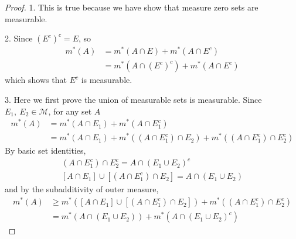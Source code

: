 \documentclass[lang=en, 12pt]{elegantbook}
\begin{document}
            \begin{proof}
                1. This is true because we have show that measure zero sets are measurable.\par
                2. Since $(E^c)^c = E$, so 
                \begin{equation*}
                    \begin{aligned}
                        m^*(A) &= m^*(A\cap E) + m^*(A \cap E^c) \\
                               &= m^*(A\cap(E^c)^c) + m^*(A \cap E^c)
                    \end{aligned}
                \end{equation*}
                which shows that $E^c$ is measurable.\par
                3. Here we first prove the union of measurable sets is measurable. Since $E_1, \ E_2 \in \mathcal{M}$, for any set $A$
                \begin{equation*}
                    \begin{aligned}
                        m^*(A) &= m^*(A \cap E_1) + m^*(A \cap E_1^c)\\
                               &= m^*(A \cap E_1) + m^*((A \cap E_1^c) \cap E_2) + m^*((A \cap E_1^c) \cap E_2^c)  
                    \end{aligned}
                \end{equation*}
                By basic set identities,
                \begin{equation*}
                    \begin{aligned}
                        (A \cap E_1^c) \cap E_2^c = A \cap (E_1 \cup E_2) ^c\\
                        [A \cap E_1] \cup [(A \cap E_1^c) \cap E_2] = A \cap (E_1 \cup E_2)
                    \end{aligned}
                \end{equation*}
                and by the subadditivity of outer measure,
                \begin{equation*}
                    \begin{aligned}
                        m^*(A) &\geq m^*([A \cap E_1] \cup [(A \cap E_1^c) \cap E_2]) + m^*((A \cap E_1^c) \cap E_2^c)\\
                               &= m^*(A \cap (E_1 \cup E_2)) + m^*(A \cap (E_1 \cup E_2)^c)
                    \end{aligned}
                \end{equation*}

\end{proof}
\end{document}
